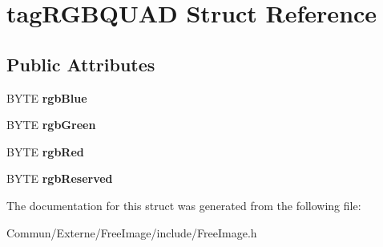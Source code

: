 \hypertarget{structtag_r_g_b_q_u_a_d}{}\section{tag\+R\+G\+B\+Q\+U\+AD Struct Reference}
\label{structtag_r_g_b_q_u_a_d}
\subsection*{Public Attributes}
\begin{DoxyCompactItemize}
\item 
B\+Y\+TE {\bfseries rgb\+Blue}\hypertarget{structtag_r_g_b_q_u_a_d_ad99c50770a73c6fae3ee1ea627da1c60}{}\label{structtag_r_g_b_q_u_a_d_ad99c50770a73c6fae3ee1ea627da1c60}

\item 
B\+Y\+TE {\bfseries rgb\+Green}\hypertarget{structtag_r_g_b_q_u_a_d_a4dae0a7db2f4d432cb4da3de4ef337bd}{}\label{structtag_r_g_b_q_u_a_d_a4dae0a7db2f4d432cb4da3de4ef337bd}

\item 
B\+Y\+TE {\bfseries rgb\+Red}\hypertarget{structtag_r_g_b_q_u_a_d_aa143fcd3ff08a04b152bee9d410821a6}{}\label{structtag_r_g_b_q_u_a_d_aa143fcd3ff08a04b152bee9d410821a6}

\item 
B\+Y\+TE {\bfseries rgb\+Reserved}\hypertarget{structtag_r_g_b_q_u_a_d_a2758aec56e37d4f3f5fde511a58f4f82}{}\label{structtag_r_g_b_q_u_a_d_a2758aec56e37d4f3f5fde511a58f4f82}

\end{DoxyCompactItemize}


The documentation for this struct was generated from the following file\+:\begin{DoxyCompactItemize}
\item 
Commun/\+Externe/\+Free\+Image/include/Free\+Image.\+h\end{DoxyCompactItemize}
